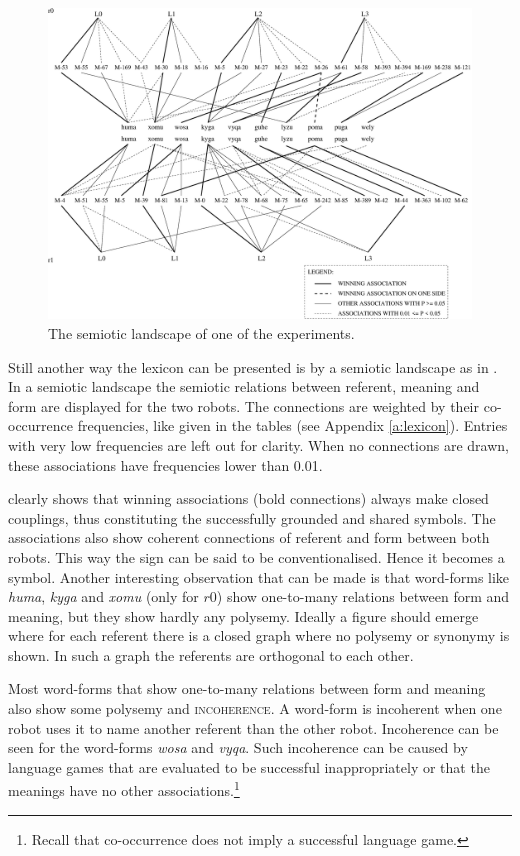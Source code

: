 \begin{figure}
\centerline{\includegraphics[width=\textwidth]{basic/semiotic.eps}}
\caption{The semiotic landscape of one of the experiments.}
\label{f:st:semiotic}
\end{figure}

Still another way the lexicon can be presented is by a semiotic landscape as in . In a semiotic landscape the semiotic relations between referent, meaning and form are displayed for the two robots. The connections are weighted by their co-occurrence frequencies, like given in the tables (see Appendix \ref{a:lexicon}). Entries with very low frequencies are left out for clarity. When no connections are drawn, these associations have frequencies lower than 0.01.

 clearly shows that winning associations (bold connections) always make closed couplings, thus constituting the successfully grounded and shared symbols. The associations also show coherent connections of referent and form between both robots. This way the sign can be said to be conventionalised. Hence it becomes a symbol. Another interesting observation that can be made is that word-forms like {\it huma}, {\it kyga} and {\it xomu} (only for $r0$) show one-to-many relations between form and meaning, but they show hardly any polysemy. Ideally a figure should emerge where for each referent there is a closed graph where no polysemy or synonymy is shown. In such a graph the referents are orthogonal to each other.

Most word-forms that show one-to-many relations between form and meaning also show some polysemy and {\scshape incoherence}. A word-form is incoherent when one robot uses it to name another referent than the other robot. Incoherence can be seen for the word-forms {\it wosa} and {\it vyqa}. Such incoherence can be caused by language games that are evaluated to be successful inappropriately or that the meanings have no other associations.\footnote{Recall that co-occurrence does not imply a successful language game.}

